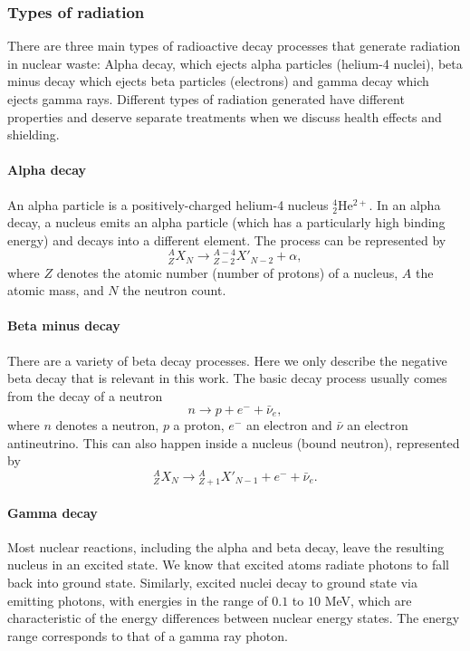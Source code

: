 \documentclass[nofootinbib,preprint,aps]{revtex4-1}
\begin{document}
        \subsubsection{Types of radiation}
        There are three main types of radioactive decay processes that generate radiation in nuclear waste: 
        Alpha decay, which ejects alpha particles (helium-4 nuclei), beta minus decay which ejects beta
        particles (electrons) and gamma decay which ejects gamma rays.
        Different types of radiation generated
        have different properties and deserve separate treatments when we discuss health effects and shielding.
        \paragraph{Alpha decay}
        An alpha particle is a positively-charged 
        helium-4 nucleus ${}^4_2$He$^{2+}$. In an alpha decay, a nucleus emits an alpha
        particle (which has a particularly high binding energy) and decays into a different element.
        The process can be represented by
        \begin{equation}
            {}^A_Z X_N \rightarrow {}^{A-4}_{Z-2}X'_{N-2} + \alpha,
        \end{equation}
        where $Z$ denotes the atomic number (number of protons) of a nucleus, $A$ the atomic mass, and $N$ the
        neutron count.

        \paragraph{Beta minus decay}
        There are a variety of beta decay processes. Here we only describe the negative beta decay that is
        relevant in this work. The basic decay process usually comes from the decay of a neutron
        \begin{equation}
            n \rightarrow p + e^- + \bar{\nu}_e,
        \end{equation}
        where $n$ denotes a neutron, $p$ a proton, $e^-$ an electron and $\bar{\nu}$ an electron antineutrino.
        This can also happen inside a nucleus (bound neutron), represented by
        \begin{equation}
            {}^A_Z X_N \rightarrow {}^A_{Z+1} X'_{N-1} + e^- + \bar{\nu}_e.
        \end{equation}

        \paragraph{Gamma decay}
        Most nuclear reactions, including the alpha and beta decay, leave the resulting nucleus in
        an excited state.
        We know that excited atoms radiate photons to fall back into ground state. Similarly, excited nuclei
        decay to ground state via emitting photons, with energies in the range
        of $0.1$ to $10$ MeV, which are characteristic of the energy differences between nuclear energy states.
        The energy range corresponds to that of a gamma ray photon.
    
\end{document}
